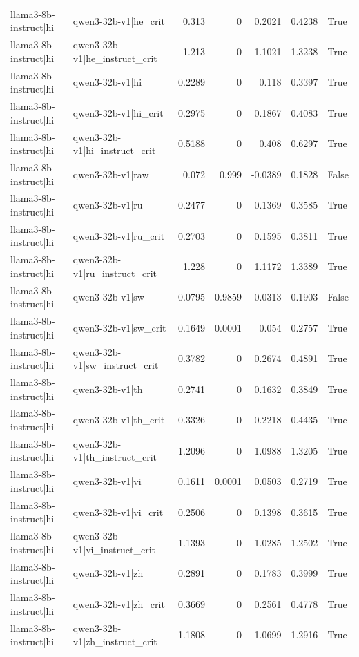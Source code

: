 \begin{table}
\begin{tabular}{l l r r r r l}
llama3-8b-instruct|hi & qwen3-32b-v1|he_crit & 0.313 & 0 & 0.2021 & 0.4238 & True \\
llama3-8b-instruct|hi & qwen3-32b-v1|he_instruct_crit & 1.213 & 0 & 1.1021 & 1.3238 & True \\
llama3-8b-instruct|hi & qwen3-32b-v1|hi & 0.2289 & 0 & 0.118 & 0.3397 & True \\
llama3-8b-instruct|hi & qwen3-32b-v1|hi_crit & 0.2975 & 0 & 0.1867 & 0.4083 & True \\
llama3-8b-instruct|hi & qwen3-32b-v1|hi_instruct_crit & 0.5188 & 0 & 0.408 & 0.6297 & True \\
llama3-8b-instruct|hi & qwen3-32b-v1|raw & 0.072 & 0.999 & -0.0389 & 0.1828 & False \\
llama3-8b-instruct|hi & qwen3-32b-v1|ru & 0.2477 & 0 & 0.1369 & 0.3585 & True \\
llama3-8b-instruct|hi & qwen3-32b-v1|ru_crit & 0.2703 & 0 & 0.1595 & 0.3811 & True \\
llama3-8b-instruct|hi & qwen3-32b-v1|ru_instruct_crit & 1.228 & 0 & 1.1172 & 1.3389 & True \\
llama3-8b-instruct|hi & qwen3-32b-v1|sw & 0.0795 & 0.9859 & -0.0313 & 0.1903 & False \\
llama3-8b-instruct|hi & qwen3-32b-v1|sw_crit & 0.1649 & 0.0001 & 0.054 & 0.2757 & True \\
llama3-8b-instruct|hi & qwen3-32b-v1|sw_instruct_crit & 0.3782 & 0 & 0.2674 & 0.4891 & True \\
llama3-8b-instruct|hi & qwen3-32b-v1|th & 0.2741 & 0 & 0.1632 & 0.3849 & True \\
llama3-8b-instruct|hi & qwen3-32b-v1|th_crit & 0.3326 & 0 & 0.2218 & 0.4435 & True \\
llama3-8b-instruct|hi & qwen3-32b-v1|th_instruct_crit & 1.2096 & 0 & 1.0988 & 1.3205 & True \\
llama3-8b-instruct|hi & qwen3-32b-v1|vi & 0.1611 & 0.0001 & 0.0503 & 0.2719 & True \\
llama3-8b-instruct|hi & qwen3-32b-v1|vi_crit & 0.2506 & 0 & 0.1398 & 0.3615 & True \\
llama3-8b-instruct|hi & qwen3-32b-v1|vi_instruct_crit & 1.1393 & 0 & 1.0285 & 1.2502 & True \\
llama3-8b-instruct|hi & qwen3-32b-v1|zh & 0.2891 & 0 & 0.1783 & 0.3999 & True \\
llama3-8b-instruct|hi & qwen3-32b-v1|zh_crit & 0.3669 & 0 & 0.2561 & 0.4778 & True \\
llama3-8b-instruct|hi & qwen3-32b-v1|zh_instruct_crit & 1.1808 & 0 & 1.0699 & 1.2916 & True \\

\end{tabular}
\end{table}
